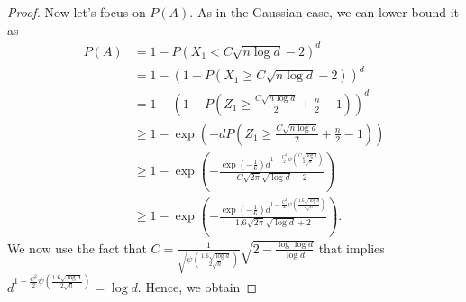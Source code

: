 \documentclass{article}
\begin{document}
\begin{proof}
Now let's focus on $P(A)$. As in the Gaussian case, we can lower bound it as
\begin{align*}
P(A)
&= 1-P(X_1 < C \sqrt{n \log d}-2)^d \\
&= 1-(1-P(X_1\geq C \sqrt{n \log d}-2))^d \\
&= 1-(1-P(Z_1\geq \frac{C \sqrt{n \log d}}{2} +\frac{n}{2}-1))^d \\
&\geq 1-\exp\left(-d P(Z_1\geq \frac{C \sqrt{n \log d}}{2} +\frac{n}{2}-1) \right) \\
&\geq 1 - \exp\left(-\frac{\exp\left(-\frac{1}{6}\right) d^{1-\frac{C^2}{2} \psi\left(\frac{C \sqrt{\log d}}{2 \sqrt{n}}\right)}}{C \sqrt{2\pi} \sqrt{\log d}+2}\right) \\
&\geq 1 - \exp\left(-\frac{\exp\left(-\frac{1}{6}\right) d^{1-\frac{C^2}{2} \psi\left(\frac{1.6 \sqrt{\log d}}{2 \sqrt{n}}\right)}}{1.6 \sqrt{2\pi} \sqrt{\log d}+2}\right).
% 
\end{align*}
We now use the fact that $C=\frac{1}{\sqrt{\psi\left(\frac{1.6 \sqrt{\log d}}{2 \sqrt{n}}\right)}}\sqrt{2- \frac{\log \log d}{\log d}}$ that implies $d^{1-\frac{C^2}{2} \psi\left(\frac{1.6 \sqrt{\log d}}{2 \sqrt{n}}\right)}=\log d$. Hence, we obtain

\end{proof}
\end{document}
